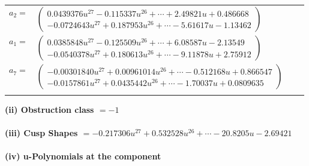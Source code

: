 \documentclass[1p]{elsarticle_modified}
\theoremstyle{definition}
\begin{document}
\begin{tabular}{m{7pt} m{180pt} m{7pt} m{180pt} }
\flushright $a_{2}=$&$\begin{pmatrix}0.0439376 u^{27}-0.115337 u^{26}+\cdots+2.49821 u+0.486668\\-0.0724643 u^{27}+0.187953 u^{26}+\cdots-5.61617 u-1.13462\end{pmatrix}$ \\
\flushright $a_{1}=$&$\begin{pmatrix}0.0385848 u^{27}-0.125509 u^{26}+\cdots+6.08587 u-2.13549\\-0.0540378 u^{27}+0.180613 u^{26}+\cdots-9.11878 u+2.75912\end{pmatrix}$ \\
\flushright $a_{7}=$&$\begin{pmatrix}-0.00301840 u^{27}+0.00961014 u^{26}+\cdots-0.512168 u+0.866547\\-0.0157861 u^{27}+0.0435442 u^{26}+\cdots-1.70037 u+0.0809635\end{pmatrix}$\\&\end{tabular}
\flushleft \textbf{(ii) Obstruction class $= -1$}\\~\\
\flushleft \textbf{(iii) Cusp Shapes $= -0.217306 u^{27}+0.532528 u^{26}+\cdots-20.8205 u-2.69421$}\\~\\
\newpage\renewcommand{\arraystretch}{1}
\flushleft \textbf{(iv) u-Polynomials at the component}\newline \\
\end{document}
